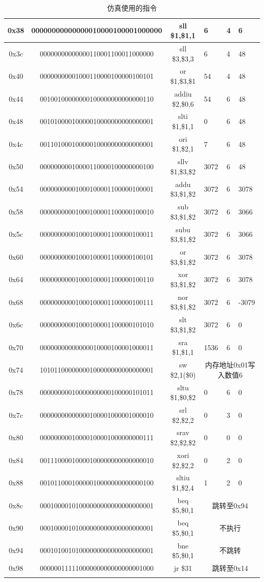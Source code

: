 \documentclass[UTF8]{ctexart}
\begin{document}
\begin{longtable}[c]{|c|c|c|p{1.2cm}<{\centering}|p{1.2cm}<{\centering}|p{1.2cm}<{\centering}|}
0x38 & 00000000000000010000100001000000 & sll \$1,\$1,1 & 6 & 4 & 6 \\ \hline
0x3c & 00000000000000110001100011000000 & sll \$3,\$3,3 & 6 & 4 & 48 \\ \hline
0x40 & 00000000001000110000100000100101 & or \$1,\$3,\$1 & 54 & 4 & 48 \\ \hline
0x44 & 00100100000000100000000000000110 & addiu \$2,\$0,6 & 54 & 6 & 48 \\ \hline
0x48 & 00101000010000010000000000000001 & slti \$1,\$1,1 & 0 & 6 & 48 \\ \hline
0x4c & 00110100010000010000000000000001 & ori \$1,\$2,1 & 7 & 6 & 48 \\ \hline
0x50 & 00000000010000110000100000000100 & sllv \$1,\$3,\$2 & 3072 & 6 & 48 \\ \hline
0x54 & 00000000001000100001100000100001 & addu \$3,\$1,\$2 & 3072 & 6 & 3078 \\ \hline
0x58 & 00000000001000100001100000100010 & sub \$3,\$1,\$2 & 3072 & 6 & 3066 \\ \hline
0x5c & 00000000001000100001100000100011 & subu \$3,\$1,\$2 & 3072 & 6 & 3066 \\ \hline
0x60 & 00000000001000100001100000100101 & or \$3,\$1,\$2 & 3072 & 6 & 3078 \\ \hline
0x64 & 00000000001000100001100000100110 & xor \$3,\$1,\$2 & 3072 & 6 & 3078 \\ \hline
0x68 & 00000000001000100001100000100111 & nor \$3,\$1,\$2 & 3072 & 6 & -3079 \\ \hline
0x6c & 00000000001000100001100000101010 & slt \$3,\$1,\$2 & 3072 & 6 & 0 \\ \hline
0x70 & 00000000000000010000100001000011 & sra \$1,\$1,1 & 1536 & 6 & 0 \\ \hline
0x74 & 10101100000000100000000000000001 & sw \$2,1(\$0) & \multicolumn{3}{c|}{内存地址0x01写入数值6}\\ \hline
0x78 & 00000000010000000000100000101011 & sltu \$1,\$0,\$2 & 0 & 6 & 0 \\ \hline
0x7c & 00000000000000100001000001000010 & srl \$2,\$2,2 & 0 & 3 & 0 \\ \hline
0x80 & 00000000010000100001000000000111 & srav \$2,\$2,\$2 & 0 & 0 & 0 \\ \hline
0x84 & 00111000010000100000000000000010 & xori \$2,\$2,2 & 0 & 2 & 0 \\ \hline
0x88 & 00101100010000010000000000000100 & sltiu \$1,\$2,4 & 1 & 2 & 0 \\ \hline
0x8c & 00010000101000000000000000000001 & beq \$5,\$0,1 & \multicolumn{3}{c|}{跳转至0x94} \\ \hline
0x90 & 00010000101000000000000000000001 & beq \$5,\$0,1 & \multicolumn{3}{c|}{不执行} \\ \hline
0x94 & 00010100101000000000000000000001 & bne \$5,\$0,1 & \multicolumn{3}{c|}{不跳转} \\ \hline
0x98 & 00000011111000000000000000001000 & jr \$31 & \multicolumn{3}{c|}{跳转至0x14} \\ \hline
\caption{仿真使用的指令}
\label{tab:sim-inst}\\
\end{longtable}
\end{document}
